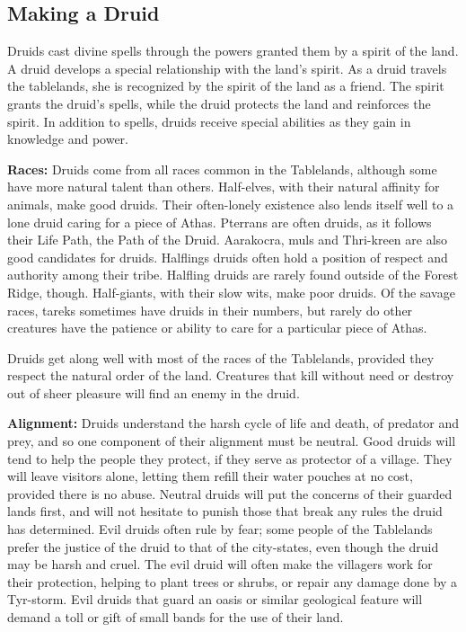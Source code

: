 \subsection{Making a Druid}

Druids cast divine spells through the powers granted them by a spirit of the land. A druid develops a special relationship with the land's spirit. As a druid travels the tablelands, she is recognized by the spirit of the land as a friend. The spirit grants the druid's spells, while the druid protects the land and reinforces the spirit. In addition to spells, druids receive special abilities as they gain in knowledge and power.

\textbf{Races:} Druids come from all races common in the Tablelands, although some have more natural talent than others. Half-elves, with their natural affinity for animals, make good druids. Their often-lonely existence also lends itself well to a lone druid caring for a piece of Athas. Pterrans are often druids, as it follows their Life Path, the Path of the Druid. Aarakocra, muls and Thri-kreen are also good candidates for druids. Halflings druids often hold a position of respect and authority among their tribe. Halfling druids are rarely found outside of the Forest Ridge, though. Half-giants, with their slow wits, make poor druids. Of the savage races, tareks sometimes have druids in their numbers, but rarely do other creatures have the patience or ability to care for a particular piece of Athas.

Druids get along well with most of the races of the Tablelands, provided they respect the natural order of the land. Creatures that kill without need or destroy out of sheer pleasure will find an enemy in the druid.

\textbf{Alignment:} Druids understand the harsh cycle of life and death, of predator and prey, and so one component of their alignment must be neutral. Good druids will tend to help the people they protect, if they serve as protector of a village. They will leave visitors alone, letting them refill their water pouches at no cost, provided there is no abuse. Neutral druids will put the concerns of their guarded lands first, and will not hesitate to punish those that break any rules the druid has determined. Evil druids often rule by fear; some people of the Tablelands prefer the justice of the druid to that of the city-states, even though the druid may be harsh and cruel. The evil druid will often make the villagers work for their protection, helping to plant trees or shrubs, or repair any damage done by a Tyr-storm. Evil druids that guard an oasis or similar geological feature will demand a toll or gift of small bands for the use of their land.

